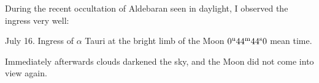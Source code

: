 During the recent occultation of Aldebaran seen in daylight, I observed the ingress very well:

\begin{center}July 16. Ingress of $\alpha$ Tauri at the bright limb of the Moon $0^{\rm u}44^{\rm m}44^{\rm s}0$ mean time.\end{center}

Immediately afterwards clouds darkened the sky, and the Moon did not come into view again.

